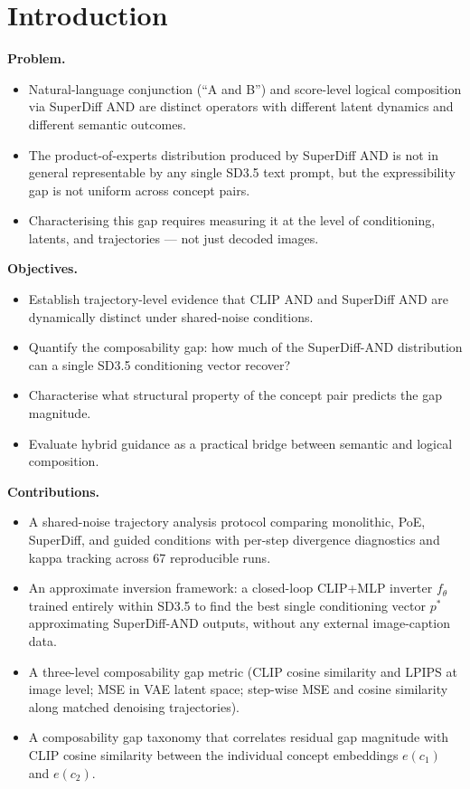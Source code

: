 \documentclass[runningheads]{llncs}
\begin{document}
\section{Introduction}

\textbf{Problem.}
\begin{itemize}
  \item Natural-language conjunction (``A and B'') and score-level logical
    composition via SuperDiff AND are distinct operators with different
    latent dynamics and different semantic outcomes.
  \item The product-of-experts distribution produced by SuperDiff AND is not
    in general representable by any single SD3.5 text prompt, but the
    expressibility gap is not uniform across concept pairs.
  \item Characterising this gap requires measuring it at the level of
    conditioning, latents, and trajectories --- not just decoded images.
\end{itemize}

\textbf{Objectives.}
\begin{itemize}
  \item Establish trajectory-level evidence that CLIP AND and SuperDiff AND
    are dynamically distinct under shared-noise conditions.
  \item Quantify the composability gap: how much of the SuperDiff-AND
    distribution can a single SD3.5 conditioning vector recover?
  \item Characterise what structural property of the concept pair predicts
    the gap magnitude.
  \item Evaluate hybrid guidance as a practical bridge between semantic and
    logical composition.
\end{itemize}

\textbf{Contributions.}
\begin{itemize}
  \item A shared-noise trajectory analysis protocol comparing monolithic,
    PoE, SuperDiff, and guided conditions with per-step divergence diagnostics
    and kappa tracking across 67 reproducible runs.
  \item An approximate inversion framework: a closed-loop CLIP+MLP inverter
    $f_\theta$ trained entirely within SD3.5 to find the best single
    conditioning vector $p^*$ approximating SuperDiff-AND outputs, without
    any external image-caption data.
  \item A three-level composability gap metric (CLIP cosine similarity and
    LPIPS at image level; MSE in VAE latent space; step-wise MSE and cosine
    similarity along matched denoising trajectories).
  \item A composability gap taxonomy that correlates residual gap magnitude
    with CLIP cosine similarity between the individual concept embeddings
    $e(c_1)$ and $e(c_2)$.
\end{itemize}
\end{document}
